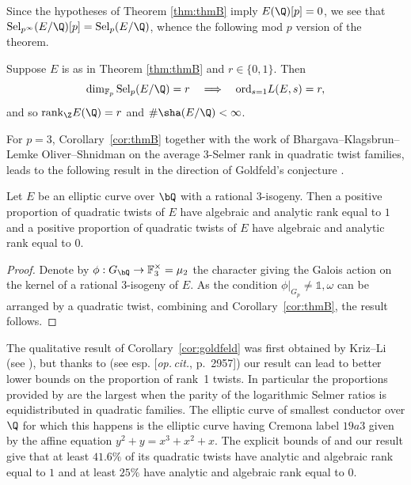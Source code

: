 Since the hypotheses of Theorem \ref{thm:thmB} imply $E(\Q)[p]= 0$, we see that ${\rm Sel}_{p^\infty}(E/\Q)[p]={\rm Sel}_p(E/\Q)$, whence the following mod $p$ version of the theorem.

\begin{cor}
\notready\label{cor:thmB} Suppose $E$ is as in Theorem \ref{thm:thmB} and $r\in\{0,1\}$. Then
\[
\dim_{\mathbb{F}_p}{\rm Sel}_p(E/\Q) = r
\quad\Longrightarrow\quad
{\rm ord}_{s=1}L(E,s)=r,
\]
and so ${\rm rank}_\Z E(\Q)=r$ and $\#\sha(E/\Q)<\infty$.
\end{cor}

For $p=3$, Corollary~\ref{cor:thmB} together with the work of Bhargava--Klagsbrun--Lemke Oliver--Shnidman \cite{BKLS} on the average $3$-Selmer rank in quadratic twist families, leads to the following result in the direction of Goldfeld's conjecture \cite{goldfeld}.

\begin{cor}
\notready\label{cor:goldfeld}
Let $E$ be an elliptic curve over $\bQ$ with a rational $3$-isogeny. Then %
a positive proportion of quadratic twists of $E$ have algebraic and analytic rank equal to $1$
and a positive proportion of quadratic twists of $E$ have algebraic and analytic rank equal to $0$.
\end{cor}

\begin{proof}
Denote by $\phi:G_\bQ\rightarrow\mathbb{F}_3^\times=\mu_2$ the character giving the Galois action on the kernel of a rational $3$-isogeny of $E$. As the condition $\phi\vert_{G_p}\neq\mathds{1},\omega$ can be arranged by a quadratic twist, combining \cite[Thm.~2.6]{BKLS} and Corollary~\ref{cor:thmB}, the result follows.
\end{proof}

\begin{remark}
\notready\label{rem:BKLS}
The qualitative result of Corollary~\ref{cor:goldfeld} was first obtained by Kriz--Li (see \cite[Thm.~1.5]{kriz-li}), but thanks to \cite{BKLS} (see esp. [\emph{op.\,cit.}, p.~2957]) our result {can lead} to better lower bounds on the proportion of rank~1 twists. In particular the proportions provided by \cite[Thm.~2.5]{BKLS} are the largest when the parity of the logarithmic Selmer ratios is equidistributed in quadratic families. The elliptic curve of smallest conductor over $\Q$ for which this happens is the elliptic curve having Cremona label $19a3$ given by the affine equation $y^2+y=x^3+x^2+x$. The explicit bounds of \cite{BKLS} and our result give that at least $41.6\%$ of its quadratic twists have analytic and algebraic rank equal to $1$ and at least $25\%$ have analytic and algebraic rank equal to $0$.
\end{remark}

